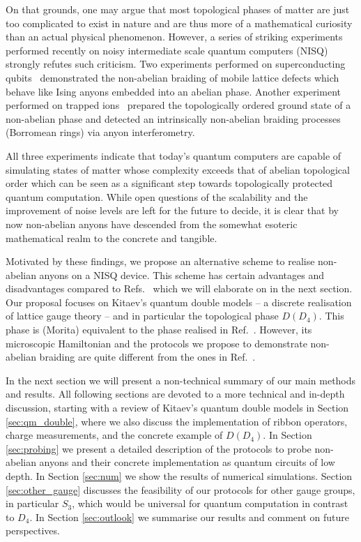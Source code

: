 \documentclass[a4paper,twocolumn,11pt]{quantumarticle}
\begin{document}
On that grounds, one may argue that most topological phases of matter are just too complicated to exist in nature and are thus more of a mathematical curiosity than an actual physical phenomenon. However, a series of striking experiments~\cite{iqbal2023creation,xu,andersen2022observation} performed recently on noisy intermediate scale quantum computers (NISQ) strongly refutes such  criticism. Two experiments performed on superconducting qubits~\cite{xu,andersen2022observation} demonstrated the non-abelian braiding of mobile lattice defects which behave like Ising anyons embedded into an abelian phase. Another experiment performed on trapped ions~\cite{iqbal2023creation} prepared the topologically ordered ground state of a non-abelian phase and detected an intrinsically non-abelian braiding processes (Borromean rings) via anyon interferometry. 


All three experiments indicate that today's quantum computers are capable of simulating states of matter whose complexity exceeds that of abelian topological order which can be seen as a significant step towards topologically protected quantum computation. While open questions of the scalability and the improvement of noise levels are left for the future to decide, it is clear that by now non-abelian anyons have descended from the somewhat esoteric mathematical realm to the concrete and tangible.

Motivated by these findings, we propose an alternative scheme to realise non-abelian anyons on a NISQ device. This scheme has certain advantages and disadvantages compared to Refs.~\cite{iqbal2023creation,xu,andersen2022observation} which we will elaborate on in the next section. Our proposal focuses on Kitaev's quantum double models -- a discrete realisation of lattice gauge theory -- and in particular the topological phase $D(D_4)$. This phase is (Morita) equivalent to the phase realised in Ref.~\cite{iqbal2023creation}. However, its microscopic Hamiltonian and the protocols we propose to demonstrate non-abelian braiding are quite different from the ones in Ref.~\cite{iqbal2023creation}. 

In the next section we will present a non-technical summary of our main methods and results. All following sections are devoted to a more technical and in-depth discussion, starting with a review of Kitaev's quantum double models in Section \ref{sec:qm_double}, where we also discuss the implementation of ribbon operators, charge measurements, and the concrete example of $D(D_4)$. In Section \ref{sec:probing} we present a detailed description of the protocols to probe non-abelian anyons and their concrete implementation as quantum circuits of low depth. In Section \ref{sec:num} we show the results of numerical simulations. Section \ref{sec:other_gauge} discusses the feasibility of our protocols for other gauge groups, in particular $S_3$, which would be universal for quantum computation in contrast to $D_4$. In Section \ref{sec:outlook} we summarise our results and comment on future perspectives.
\end{document}
